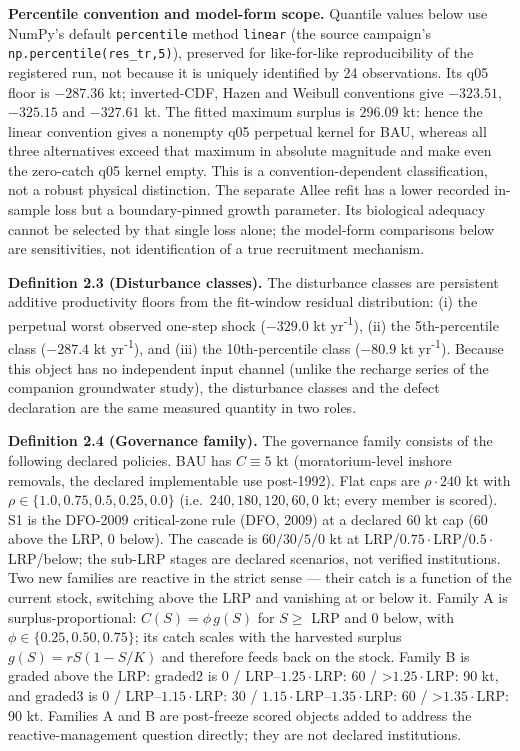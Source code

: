 \documentclass[11pt]{article}
\begin{document}
\noindent\textbf{Percentile convention and model-form scope.} Quantile
values below use NumPy's default \texttt{percentile} method \texttt{linear}
(the source campaign's \texttt{np.percentile(res\_tr,5)}), preserved for
like-for-like reproducibility of the registered run, not because it is
uniquely identified by 24 observations. Its q05 floor is $-287.36$ kt;
inverted-CDF, Hazen and Weibull conventions give $-323.51$, $-325.15$
and $-327.61$ kt. The fitted maximum surplus is $296.09$ kt: hence the
linear convention gives a nonempty q05 perpetual kernel for BAU, whereas
all three alternatives exceed that maximum in absolute magnitude and make
even the zero-catch q05 kernel empty. This is a convention-dependent
classification, not a robust physical distinction.
The separate Allee refit has a lower recorded in-sample loss but a
boundary-pinned growth parameter. Its biological adequacy cannot be
selected by that single loss alone; the model-form comparisons below
are sensitivities, not identification of a true recruitment mechanism.

\textbf{Definition 2.3 (Disturbance classes).} The disturbance classes
are persistent additive productivity floors from the fit-window residual
distribution: (i) the perpetual worst observed one-step shock
(\(-329.0\) kt yr\textsuperscript{-1}), (ii) the 5th-percentile class (\(-287.4\) kt
yr\textsuperscript{-1}), and (iii) the 10th-percentile class (\(-80.9\) kt yr\textsuperscript{-1}). Because
this object has no independent input channel (unlike the recharge series
of the companion groundwater study), the disturbance classes and the
defect declaration are the same measured quantity in two roles.

\textbf{Definition 2.4 (Governance family).} The governance family
consists of the following declared policies. BAU has \(C \equiv 5\) kt
(moratorium-level inshore removals, the declared implementable use
post-1992). Flat caps are \(\rho \cdot 240\) kt with
\(\rho \in \{1.0, 0.75, 0.5, 0.25, 0.0\}\)
(i.e.~\(240, 180, 120, 60, 0\) kt; every member is scored). S1 is the
DFO-2009 critical-zone rule (DFO, 2009) at a declared \(60\) kt cap
(\(60\) above the LRP, \(0\) below). The cascade is \(60/30/5/0\) kt at
LRP/\(0.75\cdot\)LRP/\(0.5\cdot\)LRP/below; the sub-LRP stages are
declared scenarios, not verified institutions. Two new families are
reactive in the strict sense --- their catch is a function of the
current stock, switching above the LRP and vanishing at or below it.
Family A is surplus-proportional: \(C(S) = \phi\, g(S)\) for \(S \ge\)
LRP and 0 below, with \(\phi \in \{0.25, 0.50, 0.75\}\); its catch
scales with the harvested surplus \(g(S) = rS(1 - S/K)\) and therefore
feeds back on the stock. Family B is graded above the LRP: graded2 is 0
/ LRP--\(1.25\cdot\)LRP: 60 / \textgreater{}\(1.25\cdot\)LRP: 90 kt, and
graded3 is 0 / LRP--\(1.15\cdot\)LRP: 30 /
\(1.15\cdot\)LRP--\(1.35\cdot\)LRP: 60 / \textgreater{}\(1.35\cdot\)LRP:
90 kt. Families A and B are post-freeze scored objects added to address
the reactive-management question directly; they are not declared
institutions.
\end{document}
